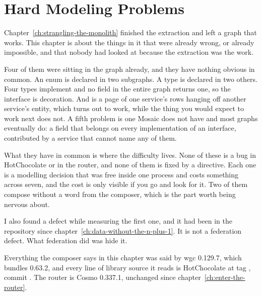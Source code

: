 \chapter{Hard Modeling Problems}
\label{ch:hard-modeling-problems}

Chapter~\ref{ch:strangling-the-monolith} finished the extraction and left a
graph that works. This chapter is about the things in it that were already
wrong, or already impossible, and that nobody had looked at because the
extraction was the work.

Four of them were sitting in the graph already, and they have nothing obvious in
common. An enum is declared in two subgraphs. A  type is declared in
two others. Four types implement  and no field in the entire graph
returns one, so the interface is decoration. And  is a
page of one service's rows hanging off another service's entity, which turns out
to work, while the thing you would expect to work next does not. A fifth problem
is one Mosaic does not have and most graphs eventually do: a field that belongs
on every implementation of an interface, contributed by a service that cannot
name any of them.

What they have in common is where the difficulty lives. None of these is a bug
in HotChocolate or in the router, and none of them is fixed by a directive. Each
one is a modelling decision that was free inside one process and costs something
across seven, and the cost is only visible if you go and look for it. Two of
them compose without a word from the composer, which is the part worth being
nervous about.

I also found a defect while measuring the first one, and it had been in the
repository since chapter~\ref{ch:data-without-the-n-plus-1}. It is not a
federation defect. What federation did was hide it.

Everything the composer says in this chapter was said by wgc 0.129.7, which
bundles  0.63.2, and every line of library source
it reads is HotChocolate at tag , commit . The router
is Cosmo 0.337.1, unchanged since chapter~\ref{ch:enter-the-router}.









